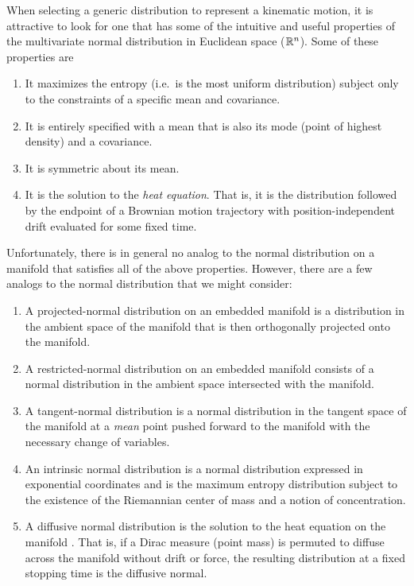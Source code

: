 \documentclass[../main.tex]{subfiles}
\begin{document}
\begin{refsection}
When selecting a generic distribution to represent a kinematic motion, it is attractive to look for one that has some of the intuitive and useful properties of the multivariate normal distribution in Euclidean space ($\mathbb{R}^n$).
Some of these properties are
\begin{enumerate}
\def\labelenumi{\arabic{enumi}.}
\item
  It maximizes the entropy (i.e.~is the most uniform distribution) subject only to the constraints of a specific mean and covariance.
\item
  It is entirely specified with a mean that is also its mode (point of highest density) and a covariance.
\item
  It is symmetric about its mean.
\item
  It is the solution to the \emph{heat equation}. That is, it is the distribution followed by the endpoint of a Brownian motion trajectory with position-independent drift evaluated for some fixed time.
\end{enumerate}
Unfortunately, there is in general no analog to the normal distribution on a manifold that satisfies all of the above properties.
However, there are a few analogs to the normal distribution that we might consider:
\begin{enumerate}
\def\labelenumi{\arabic{enumi}.}
\item
  A projected-normal distribution on an embedded manifold is a distribution in the ambient space of the manifold that is then orthogonally projected onto the manifold.
\item
  A restricted-normal distribution on an embedded manifold consists of a normal distribution in the ambient space intersected with the manifold.
\item
  A tangent-normal distribution is a normal distribution in the tangent space of the manifold at a \emph{mean} point pushed forward to the manifold with the necessary change of variables.
\item
  An intrinsic normal distribution is a normal distribution expressed in exponential coordinates and is the maximum entropy distribution subject to the existence of the Riemannian center of mass and a notion of concentration. \cite{pennec_intrinsic_2006}
\item
  A diffusive normal distribution is the solution to the heat equation on the manifold .
  That is, if a Dirac measure (point mass) is permuted to diffuse across the manifold without drift or force, the resulting distribution at a fixed stopping time is the diffusive normal.

\end{enumerate}
\end{refsection}
\end{document}
